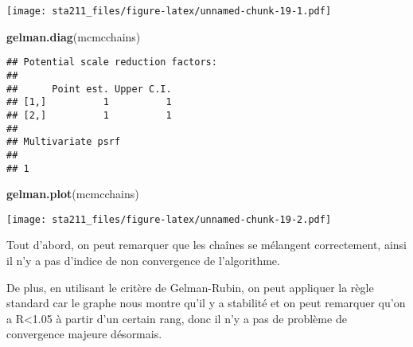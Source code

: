 \documentclass[
]{article}
\newenvironment{Shaded}{\begin{snugshade}}{\end{snugshade}}
\newcommand{\DataTypeTok}[1]{\textcolor[rgb]{0.13,0.29,0.53}{#1}}
\newcommand{\DecValTok}[1]{\textcolor[rgb]{0.00,0.00,0.81}{#1}}
\newcommand{\FloatTok}[1]{\textcolor[rgb]{0.00,0.00,0.81}{#1}}
\newcommand{\KeywordTok}[1]{\textcolor[rgb]{0.13,0.29,0.53}{\textbf{#1}}}
\newcommand{\NormalTok}[1]{#1}
\newcommand{\OperatorTok}[1]{\textcolor[rgb]{0.81,0.36,0.00}{\textbf{#1}}}
\newcommand{\OtherTok}[1]{\textcolor[rgb]{0.56,0.35,0.01}{#1}}
\newcommand{\StringTok}[1]{\textcolor[rgb]{0.31,0.60,0.02}{#1}}
\begin{document}
\begin{Shaded}
\end{Shaded}

\texttt{[image: sta211\_files/figure-latex/unnamed-chunk-19-1.pdf]}

\begin{Shaded}
\begin{Highlighting}[]
\KeywordTok{gelman.diag}\NormalTok{(mcmcchains)}
\end{Highlighting}
\end{Shaded}

\begin{verbatim}
## Potential scale reduction factors:
## 
##      Point est. Upper C.I.
## [1,]          1          1
## [2,]          1          1
## 
## Multivariate psrf
## 
## 1
\end{verbatim}

\begin{Shaded}
\begin{Highlighting}[]
\KeywordTok{gelman.plot}\NormalTok{(mcmcchains)}
\end{Highlighting}
\end{Shaded}

\texttt{[image: sta211\_files/figure-latex/unnamed-chunk-19-2.pdf]}

Tout d'abord, on peut remarquer que les chaînes se mélangent
correctement, ainsi il n'y a pas d'indice de non convergence de
l'algorithme.

De plus, en utilisant le critère de Gelman-Rubin, on peut appliquer la
règle standard car le graphe nous montre qu'il y a stabilité et on peut
remarquer qu'on a R\textless1.05 à partir d'un certain rang, donc il n'y
a pas de problème de convergence majeure désormais.
\end{document}
